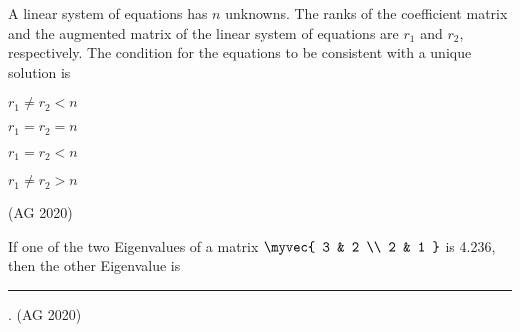 \item 
A linear system of equations has $n$ unknowns. The ranks of the coefficient matrix and the augmented matrix of the linear system of equations are $r_1$ and $r_2$, respectively. The condition for the equations to be consistent with a unique solution is
\begin{enumerate}
\begin{multicols}{4}
\item $r_1 \neq r_2 < n$
\item $r_1 = r_2 = n$
\item $r_1 = r_2 < n$
\item $r_1 \neq r_2 > n$
\end{multicols}
\end{enumerate}
\hfill(AG 2020)
\item 
If one of the two Eigenvalues of a matrix
$\myvec{ 3 & 2 \\ 2 & 1 }$ is 4.236, then the other Eigenvalue is \rule{1cm}{0.01pt}.
\hfill(AG 2020)

